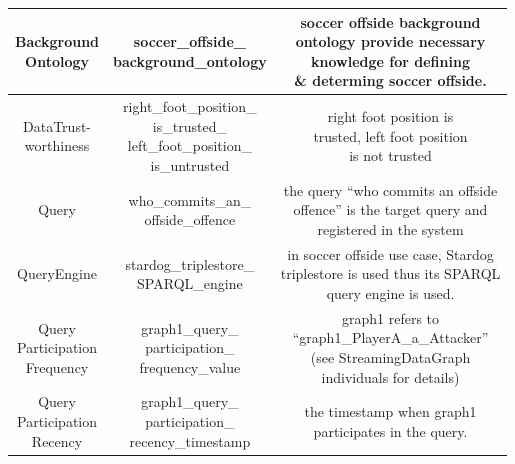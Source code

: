 \begin{center}
\begin{longtable}{|c||c||c|}
\hline
\endlastfoot
\makecell{Background\\Ontology} & \makecell{soccer\_offside\_\\background\_ontology} & \makecell{soccer offside background \\ ontology provide necessary \\ knowledge for defining \\\& determing soccer offside.} \\ \hline
\makecell{DataTrust-\\worthiness} & \makecell{right\_foot\_position\_\\is\_trusted\_\\left\_foot\_position\_\\is\_untrusted} & \makecell{right foot position is\\ trusted, left foot position \\is not trusted} \\ \hline
Query & \makecell{who\_commits\_an\_\\offside\_offence} & \makecell{the query ``who commits an offside \\offence'' is the target query and \\registered in the system} \\ \hline
QueryEngine & \makecell{stardog\_triplestore\_\\SPARQL\_engine} & \makecell{in soccer offside use case, Stardog \\triplestore is used thus its SPARQL \\query engine is used.} \\ \hline
\makecell{Query\\Participation\\Frequency} & \makecell{graph1\_query\_\\participation\_\\frequency\_value} & \makecell{graph1 refers to\\``graph1\_PlayerA\_a\_Attacker''\\ (see StreamingDataGraph \\individuals for details)} \\ \hline
\makecell{Query\\Participation\\Recency} & \makecell{graph1\_query\_\\participation\_\\recency\_timestamp} & \makecell{the timestamp when graph1 \\participates in the query.} \\ \hline

\end{longtable}
\end{center}

